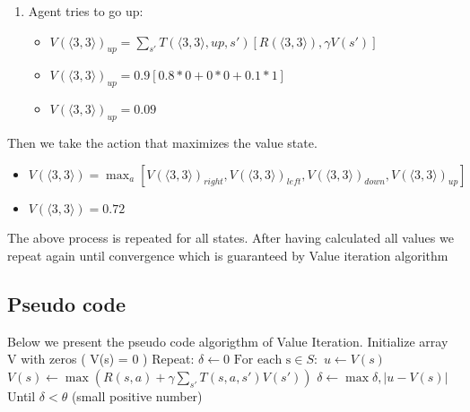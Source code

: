 \documentclass[10pt,a4paper,twocolumn]{article}
\begin{document}
\begin{enumerate}
		\item Agent tries to go up: 
		\begin{itemize}
			
			\item 
			\begin{split}
				$V(\big \langle 3,3 \big \rangle)_{up} = \sum_{s'} T(\big \langle 3,3 \big \rangle, up, s') [R(\big \langle 3,3 \big \rangle), \gamma V(s')]$	
			\end{split}
		\end{itemize}
		\begin{itemize}
			\item $V(\big \langle 3,3 \big \rangle)_{up} = 0.9[0.8 * 0 + 0 * 0 + 0.1 * 1]$
		\end{itemize}
		\begin{itemize}
			\item $V(\big \langle 3,3 \big \rangle)_{up} = 0.09$
		\end{itemize}
	\end{enumerate}

	Then we take the action that maximizes the value state. 
		
	\begin{itemize}
		\item $V(\big \langle 3,3 \big \rangle) = \max_{a} [V(\big \langle 3,3 \big 
		\rangle)_{right},V(\big \langle 3,3 \big \rangle)_{left}, V(\big \langle 3,3 \big \rangle)_{down}, V(\big \langle 3,3 \big \rangle)_{up}]$
	\end{itemize}
		\begin{itemize}
		\item $V(\big \langle 3,3 \big \rangle) = 0.72$
	\end{itemize}
	The above process is repeated for all states. After having calculated all values we repeat again until convergence which is guaranteed by Value iteration algorithm
	\subsection{Pseudo code}
	Below we present the pseudo code algorigthm of Value Iteration.
	\newline
	Initialize array V with zeros ( V(s) = 0 )
	\newline
	Repeat:
	\newline
	$\delta \leftarrow 0$
	\newline
	$\text{For each s} \in S:$
	\newline
	$u \leftarrow V(s)$
	\newline
	$V(s) \leftarrow \max{ ( R(s,a) + \gamma \sum_{s'}T(s,a,s')V(s') )}$
	\newline
	$\delta \leftarrow \max{\delta, | u - V(s)|}$
	\newline
	Until $\delta < \theta$ (small positive number)
	
\end{document}
